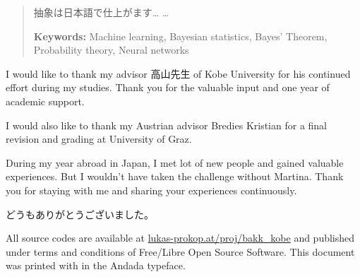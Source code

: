 \documentclass[a4paper,oneside]{book}
\theoremstyle{plain}
\begin{document}
\begin{abstract}%
  \parskip5pt
  抽象は日本語で仕上がます… \dots

  \vspace{3pt}
  \textbf{Keywords:}
    Machine learning, Bayesian statistics, Bayes' Theorem, Probability theory, Neural networks
\end{abstract}

\begin{acknowledgements}%
  \parskip5pt
  I would like to thank my advisor 高山先生 of Kobe University for his continued effort during my studies.
  Thank you for the valuable input and one year of academic support.

  I would also like to thank my Austrian advisor Bredies Kristian for a final revision and grading
  at University of Graz.

  During my year abroad in Japan, I met lot of new people and gained valuable experiences.
  But I wouldn't have taken the challenge without Martina. Thank you for staying with me
  and sharing your experiences continuously.

  どうもありがとうございました。
\end{acknowledgements}

All source codes are available at \href{http://lukas-prokop.at/proj/bakk\_kobe}{lukas-prokop.at/proj/bakk\_kobe}
and published under terms and conditions of Free/Libre Open Source Software.
This document was printed with \XeLaTeX{} in the Andada typeface.

\tableofcontents
\mainmatter



%

\backmatter
\printbibliography
\end{document}
